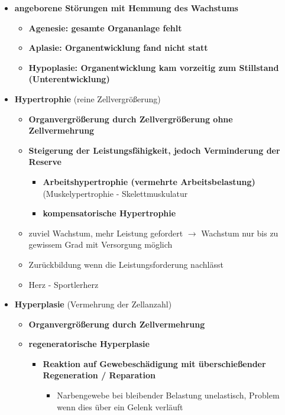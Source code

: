 \begin{itemize}
\begin{itemize}
\begin{itemize}
\begin{itemize}
							\end{itemize}
				\end{itemize}
			\end{itemize}
		\item \textbf{angeborene Störungen mit Hemmung des Wachstums}
			\begin{itemize}
				\item \textbf{Agenesie: gesamte Organanlage fehlt}
				\item \textbf{Aplasie: Organentwicklung fand nicht statt}
				\item \textbf{Hypoplasie: Organentwicklung kam vorzeitig zum Stillstand (Unterentwicklung)}
			\end{itemize}
\pagebreak
		\item \textbf{Hypertrophie} (reine Zellvergrößerung)
			\begin{itemize}
				\item \textbf{Organvergrößerung durch Zellvergrößerung ohne Zellvermehrung}
				\item \textbf{Steigerung der Leistungsfähigkeit, jedoch Verminderung der Reserve}
					\begin{itemize}
						\item \textbf{Arbeitshypertrophie (vermehrte Arbeitsbelastung)} (Muskelypertrophie - Skelettmuskulatur
						\item \textbf{kompensatorische Hypertrophie}
					\end{itemize}
				\item zuviel Wachstum, mehr Leistung gefordert $\rightarrow$ Wachstum nur bis zu gewissem Grad mit Versorgung möglich
				\item Zurückbildung wenn die Leistungsforderung nachlässt
				\item Herz - Sportlerherz
			\end{itemize}
		\item \textbf{Hyperplasie} (Vermehrung der Zellanzahl)
			\begin{itemize}
				\item \textbf{Organvergrößerung durch Zellvermehrung}
				\item \textbf{regeneratorische Hyperplasie}
					\begin{itemize}
						\item \textbf{Reaktion auf Gewebeschädigung mit überschießender Regeneration / Reparation}
							\begin{itemize}
								\item Narbengewebe bei bleibender Belastung unelastisch, Problem wenn dies über ein Gelenk verläuft

\end{itemize}
\end{itemize}
\end{itemize}
\end{itemize}
